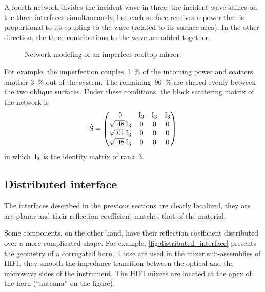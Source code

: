 A fourth network divides the incident wave in three: the incident wave shines on the three interfaces simultaneously, but each surface receives a power that is proportional to its coupling to the wave (related to its surface area).
In the other direction, the three contributions to the wave are added together.

\begin{figure}
    \centering
    
    \caption{Network modeling of an imperfect rooftop mirror.}
    \label{fig:rooftop_networks}
\end{figure}

\begin{samepage}
For example, the imperfection couples~\SI{1}{\percent} of the incoming power and scatters another \SI{3}{\percent} out of the system.
The remaining~\SI{96}{\percent} are shared evenly between the two oblique surfaces.
Under these conditions, the block scattering matrix of the network is
\begin{equation}
    \hat{\mathrm{S}}
    =
    \begin{pmatrix}
        0 & \mathrm{I}_3 & \mathrm{I}_3 & \mathrm{I}_3\\
        \sqrt{.48}\,\mathrm{I}_3 & 0 & 0 & 0\\ 
        \sqrt{.01}\,\mathrm{I}_3 & 0 & 0 & 0\\
        \sqrt{.48}\,\mathrm{I}_3 & 0 & 0 & 0
    \end{pmatrix}
\end{equation}
in which~$\mathrm{I}_3$ is the identity matrix of rank~3.
\end{samepage}




\subsection{Distributed interface}

The interfaces described in the previous sections are clearly localized, they are are planar and their reflection coefficient matches that of the material.

Some components, on the other hand, have their reflection coefficient distributed over a more complicated shape.
For example, \cref{fig:distributed_interface} presents the geometry of a corrugated horn.
Those are used in the mixer sub-assemblies of HIFI, they smooth the impedance transition between the optical and the microwave sides of the instrument.
The HIFI mixers are located at the apex of the horn (``antenna'' on the figure).

